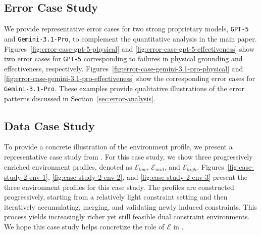 \subsection{Error Case Study}
\label{app:error-example}

We provide representative error cases for two strong proprietary models, \texttt{GPT-5} and \texttt{Gemini-3.1-Pro}, to complement the quantitative analysis in the main paper. Figures~\ref{fig:error-case-gpt-5-physical} and \ref{fig:error-case-gpt-5-effectiveness} show two error cases for \texttt{GPT-5} corresponding to failures in physical grounding and effectiveness, respectively. Figures~\ref{fig:error-case-gemini-3.1-pro-physical} and \ref{fig:error-case-gemini-3.1-pro-effectiveness} show the corresponding error cases for \texttt{Gemini-3.1-Pro}.
These examples provide qualitative illustrations of the error patterns discussed in Section~\ref{sec:error-analysis}.

\subsection{Data Case Study}
\label{app:case-example}



To provide a concrete illustration of the environment profile, we present a representative case study from \bench{}.
For this case study, we show three progressively enriched environment profiles, denoted as \(\mathcal{E}_{low}\), \(\mathcal{E}_{mid}\), and \(\mathcal{E}_{high}\).
Figures~\ref{fig:case-study-2-env-1}, \ref{fig:case-study-2-env-2}, and \ref{fig:case-study-2-env-3} present the three environment profiles for this case study.
The profiles are constructed progressively, starting from a relatively light constraint setting and then iteratively accumulating, merging, and validating newly induced constraints.
This process yields increasingly richer yet still feasible dual constraint environments.
We hope this case study helps concretize the role of \(\mathcal{E}\) in \bench{}.

















